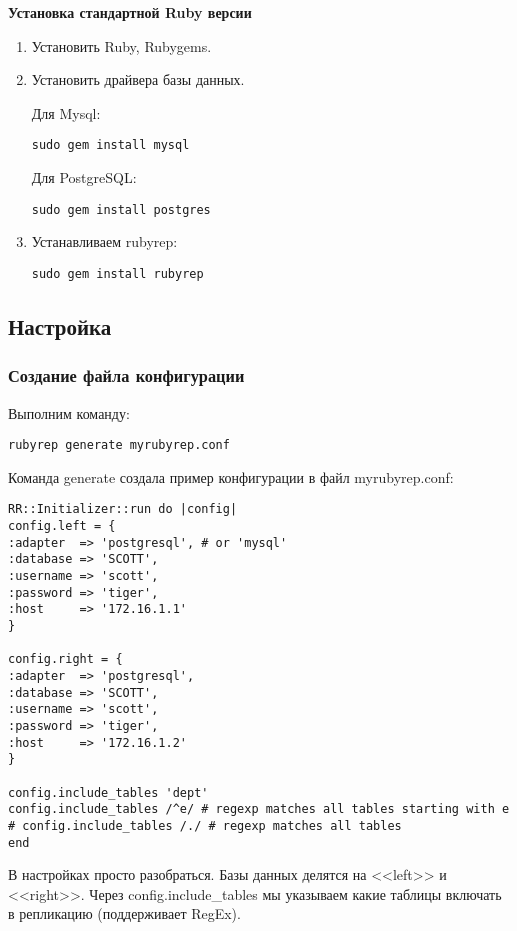 \textbf{Установка стандартной Ruby версии}
\begin{enumerate}
\item Установить Ruby, Rubygems.
\item Установить драйвера базы данных.

Для Mysql: 
\begin{lstlisting}[label=lst:rubyrep1,caption=Установка]
sudo gem install mysql
\end{lstlisting}

Для PostgreSQL:
\begin{lstlisting}[label=lst:rubyrep2,caption=Установка]
sudo gem install postgres
\end{lstlisting}

\item Устанавливаем rubyrep:
\begin{lstlisting}[label=lst:rubyrep3,caption=Установка]
sudo gem install rubyrep
\end{lstlisting}
\end{enumerate}


\subsection{Настройка}
\subsubsection{Создание файла конфигурации}
Выполним команду:
\begin{lstlisting}[label=lst:rubyrep4,caption=Настройка]
rubyrep generate myrubyrep.conf
\end{lstlisting}

Команда generate создала пример конфигурации в файл myrubyrep.conf:
\begin{lstlisting}[label=lst:rubyrep5,caption=Настройка]
RR::Initializer::run do |config|
config.left = {
:adapter  => 'postgresql', # or 'mysql'
:database => 'SCOTT',
:username => 'scott',
:password => 'tiger',
:host     => '172.16.1.1'
}
 
config.right = {
:adapter  => 'postgresql',
:database => 'SCOTT',
:username => 'scott',
:password => 'tiger',
:host     => '172.16.1.2'
}
 
config.include_tables 'dept'
config.include_tables /^e/ # regexp matches all tables starting with e
# config.include_tables /./ # regexp matches all tables
end
\end{lstlisting}

В настройках просто разобраться. Базы данных делятся на <<left>> и <<right>>.
Через config.include\_tables мы указываем какие таблицы включать в репликацию (поддерживает RegEx).

